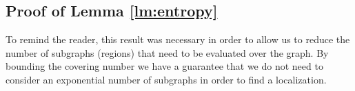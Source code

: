 \subsection{Proof of Lemma \ref{lm:entropy}}
To remind the reader, this result was necessary in order to allow us to reduce the number of subgraphs (regions) that need to be evaluated over the graph. By bounding the covering number we have a guarantee that we do not need to consider an exponential number of subgraphs in order to find a localization.

%
%

